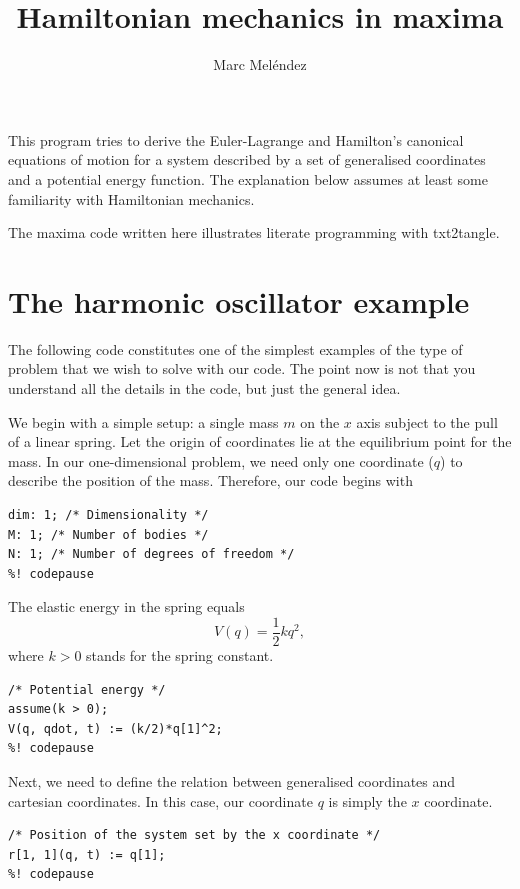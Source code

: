 \documentclass{article}
\title{Hamiltonian mechanics in maxima}
\author{Marc Meléndez}
\begin{document}
\maketitle


This program tries to derive the Euler-Lagrange and Hamilton's canonical
equations of motion for a system described by a set of generalised coordinates
and a potential energy function. The explanation below assumes at least some
familiarity with Hamiltonian mechanics.

The maxima code written here illustrates literate programming with txt2tangle.


\section{The harmonic oscillator example}

The following code constitutes one of the simplest examples of the type of
problem that we wish to solve with our code. The point now is not that you
understand all the details in the code, but just the general idea.

We begin with a simple setup: a single mass $m$ on the $x$ axis subject to the
pull of a linear spring. Let the origin of coordinates lie at the equilibrium
point for the mass. In our one-dimensional problem, we need only one coordinate
($q$) to describe the position of the mass. Therefore, our code begins with

\begin{lstlisting}[frame=single]
%! codefile: harmonic.mc
dim: 1; /* Dimensionality */
M: 1; /* Number of bodies */
N: 1; /* Number of degrees of freedom */
%! codepause
\end{lstlisting}

The elastic energy in the spring equals
\begin{equation*}
  V(q) = \frac{1}{2} k q^2,
\end{equation*}
where $k > 0$ stands for the spring constant.
\begin{lstlisting}[frame=single]
%! codecontinue: harmonic.mc
/* Potential energy */
assume(k > 0);
V(q, qdot, t) := (k/2)*q[1]^2;
%! codepause
\end{lstlisting}
Next, we need to define the relation between generalised coordinates and
cartesian coordinates. In this case, our coordinate $q$ is simply the
$x$ coordinate.
\begin{lstlisting}[frame=single]
%! codecontinue: harmonic.mc
/* Position of the system set by the x coordinate */
r[1, 1](q, t) := q[1];
%! codepause
\end{lstlisting}
\end{document}
